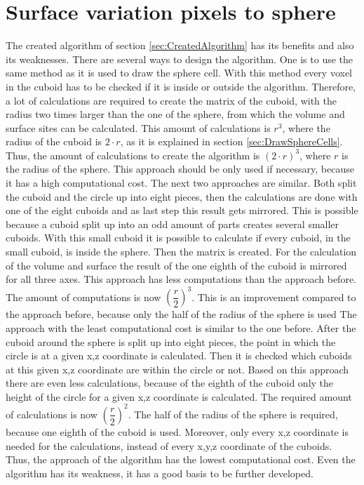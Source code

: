 \section{Surface variation pixels to sphere}
The created algorithm of section \ref{sec:CreatedAlgorithm} has its benefits and also its weaknesses. There are several ways to design the algorithm. One is to use the same method as it is used to draw the sphere cell. With this method every voxel in the cuboid has to be checked if it is inside or outside the algorithm. Therefore, a lot of calculations are required to create the matrix of the cuboid, with the radius two times larger than the one of the sphere, from which the volume and surface sites can be calculated. This amount of calculations is $r^{3}$, where the radius of the cuboid is $2 \cdot r$, as it is explained in section \ref{sec:DrawSphereCells}. Thus, the amount of calculations to create the algorithm is $(2 \cdot r)^{3}$, where $r$ is the radius of the sphere. This approach should be only used if necessary, because it has a high computational cost. \newline
The next two approaches are similar. Both split the cuboid and the circle up into eight pieces, then the calculations are done with one of the eight cuboids and as last step this result gets mirrored. This is possible because a cuboid split up into an odd amount of parts creates several smaller cuboids. With this small cuboid it is possible to calculate if every cuboid, in the small cuboid, is inside the sphere. Then the matrix is created. For the calculation of the volume and surface the result of the one eighth of the cuboid is mirrored for all three axes. This approach has less computations than the approach before. The amount of computations is now $(\dfrac{r}{2})^{3}$. This is an improvement compared to the approach before, because only the half of the radius of the sphere is used \newline
The approach with the least computational cost is similar to the one before. After the cuboid around the sphere is split up into eight pieces, the point in which the circle is at a given x,z coordinate is calculated. Then it is checked which cuboids at this given x,z coordinate are within the circle or not. Based on this approach there are even less calculations, because of the eighth of the cuboid only the height of the circle for a given x,z coordinate is calculated. The required amount of calculations is now $(\dfrac{r}{2})^{2}$. The half of the radius of the sphere is required, because one eighth of the cuboid is used. Moreover, only every x,z coordinate is needed for the calculations, instead of every x,y,z coordinate of the cuboids. Thus, the approach of the algorithm has the lowest computational cost. Even the algorithm has its weakness, it has a good basis to be further developed.


